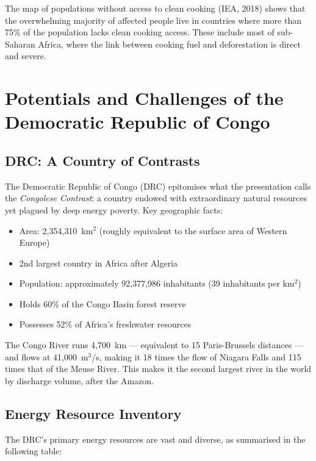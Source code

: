 The map of populations without access to clean cooking (IEA, 2018) shows that the overwhelming majority of affected people live in countries where more than 75\% of the population lacks clean cooking access. These include most of sub-Saharan Africa, where the link between cooking fuel and deforestation is direct and severe.

\section{Potentials and Challenges of the Democratic Republic of Congo}

\subsection{DRC: A Country of Contrasts}

The Democratic Republic of Congo (DRC) epitomises what the presentation calls the \textit{Congolese Contrast}: a country endowed with extraordinary natural resources yet plagued by deep energy poverty. Key geographic facts:

\begin{itemize}[noitemsep]
    \item Area: 2{,}354{,}310~km$^2$ (roughly equivalent to the surface area of Western Europe)
    \item 2nd largest country in Africa after Algeria
    \item Population: approximately 92{,}377{,}986 inhabitants (39 inhabitants per km$^2$)
    \item Holds 60\% of the Congo Basin forest reserve
    \item Possesses 52\% of Africa's freshwater resources
\end{itemize}

The Congo River runs 4{,}700~km — equivalent to 15 Paris-Brussels distances — and flows at 41{,}000~m$^3$/s, making it 18 times the flow of Niagara Falls and 115 times that of the Meuse River. This makes it the second largest river in the world by discharge volume, after the Amazon.

\subsection{Energy Resource Inventory}

The DRC's primary energy resources are vast and diverse, as summarised in the following table:

